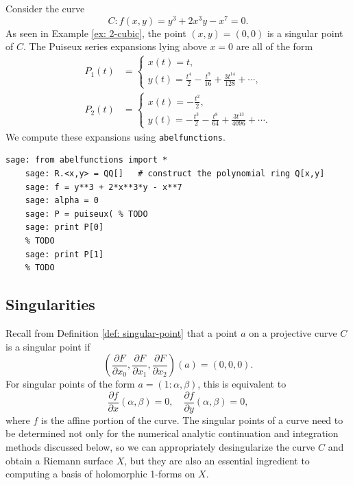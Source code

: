 \begin{example} \label{ex: 3-puiseux} Consider the curve
  \[
      C : f(x,y) = y^3 + 2x^3y - x^7 = 0.
  \]
  As seen in Example \ref{ex: 2-cubic}, the point $(x,y) = (0,0)$ is a singular
  point of $C$. The Puiseux series expansions lying above $x=0$ are all of the
  form
  \begin{align*}
    P_1(t) &=
             \begin{cases}
               x(t) = t, \\
               y(t) = \frac{t^{4}}{2} - \frac{t^{9}}{16} + \frac{3 t^{14}}{128}
               + \cdots,
             \end{cases} \\
    P_2(t) &=
             \begin{cases}
               x(t) = - \frac{t^{2}}{2}, \\
               y(t) = - \frac{t^{3}}{2} - \frac{t^{8}}{64} + \frac{3
                 t^{13}}{4096} + \cdots.
             \end{cases}
  \end{align*}
  We compute these expansions using {\tt abelfunctions}.

  \begin{lstlisting}[language=Sage]
    sage: from abelfunctions import *
    sage: R.<x,y> = QQ[]   # construct the polynomial ring Q[x,y]
    sage: f = y**3 + 2*x**3*y - x**7
    sage: alpha = 0
    sage: P = puiseux( % TODO
    sage: print P[0]
    % TODO
    sage: print P[1]
    % TODO
  \end{lstlisting}
\end{example}

\subsection{Singularities}\label{subsec:background-singularities}

Recall from Definition \ref{def: singular-point} that a point $a$ on a
projective curve $C$ is a singular point if
\[
  \left( \frac{\partial F}{\partial x_0}, \frac{\partial F}{\partial x_1},
    \frac{\partial F}{\partial x_2} \right) (a) = (0,0,0).
\]
For singular points of the form $a = (1 : \alpha, \beta)$, this is equivalent to
\[
  \frac{\partial f}{\partial x} (\alpha,\beta) = 0, \quad \frac{\partial
    f}{\partial y} (\alpha,\beta) = 0,
\]
where $f$ is the affine portion of the curve. The singular points of a curve
need to be determined not only for the numerical analytic continuation and
integration methods discussed below, so we can appropriately desingularize the
curve $C$ and obtain a Riemann surface $X$, but they are also an essential
ingredient to computing a basis of holomorphic 1-forms on $X$.

